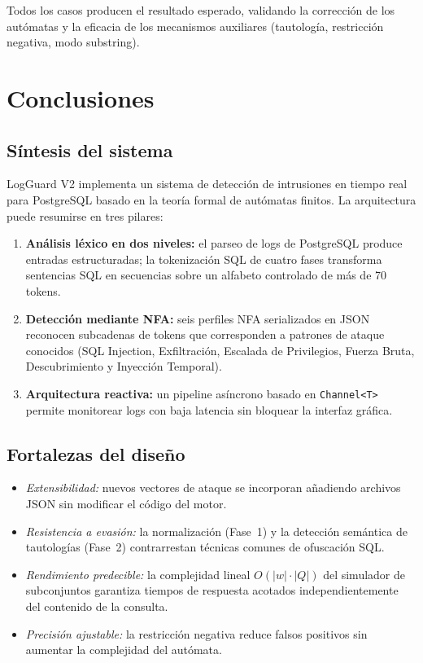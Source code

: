 \documentclass[12pt, a4paper]{report}
\theoremstyle{definition}
\theoremstyle{remark}
\begin{document}
Todos los casos producen el resultado esperado, validando la corrección de los
autómatas y la eficacia de los mecanismos auxiliares (tautología, restricción
negativa, modo substring).

\chapter{Conclusiones}

\section{Síntesis del sistema}

LogGuard V2 implementa un sistema de detección de intrusiones en tiempo real
para PostgreSQL basado en la teoría formal de autómatas finitos. La arquitectura
puede resumirse en tres pilares:

\begin{enumerate}
  \item \textbf{Análisis léxico en dos niveles:} el parseo de logs de PostgreSQL
    produce entradas estructuradas; la tokenización SQL de cuatro fases transforma
    sentencias SQL en secuencias sobre un alfabeto controlado de más de 70 tokens.
  \item \textbf{Detección mediante NFA:} seis perfiles NFA serializados en JSON
    reconocen subcadenas de tokens que corresponden a patrones de ataque
    conocidos (SQL Injection, Exfiltración, Escalada de Privilegios, Fuerza
    Bruta, Descubrimiento y Inyección Temporal).
  \item \textbf{Arquitectura reactiva:} un pipeline asíncrono basado en
    \texttt{Channel\textless T\textgreater} permite monitorear logs con baja latencia sin bloquear
    la interfaz gráfica.
\end{enumerate}

\section{Fortalezas del diseño}

\begin{itemize}
  \item \emph{Extensibilidad:} nuevos vectores de ataque se incorporan añadiendo
    archivos JSON sin modificar el código del motor.
  \item \emph{Resistencia a evasión:} la normalización (Fase~1) y la detección
    semántica de tautologías (Fase~2) contrarrestan técnicas comunes de
    ofuscación SQL.
  \item \emph{Rendimiento predecible:} la complejidad lineal $O(|w| \cdot |Q|)$
    del simulador de subconjuntos garantiza tiempos de respuesta acotados
    independientemente del contenido de la consulta.
  \item \emph{Precisión ajustable:} la restricción negativa reduce falsos
    positivos sin aumentar la complejidad del autómata.
\end{itemize}
\end{document}
